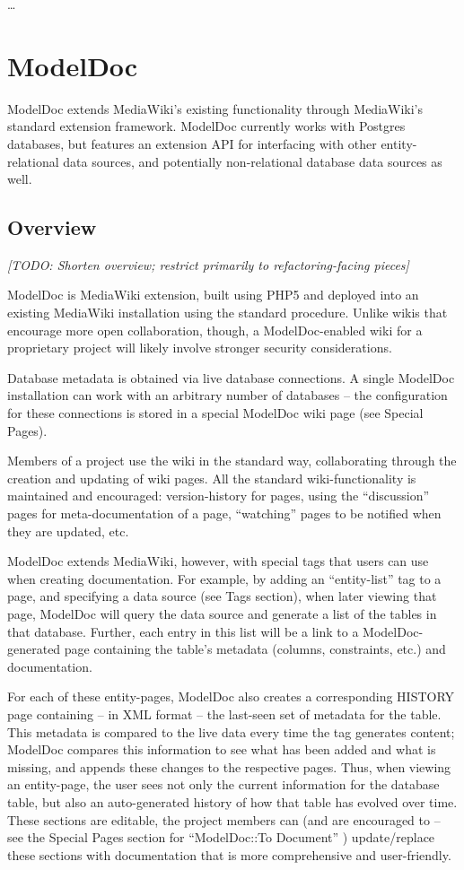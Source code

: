 \documentclass{acm_proc_article-sp}
\begin{document}
\ldots

\section{ModelDoc}

ModelDoc extends MediaWiki's existing functionality through MediaWiki's
standard extension framework.  ModelDoc currently works with Postgres
databases, but features an extension API for interfacing with other
entity-relational data sources, and potentially non-relational database data
sources as well.

\subsection{Overview}

\textit{[TODO: Shorten overview; restrict primarily to refactoring-facing
pieces]}

ModelDoc is MediaWiki extension, built using PHP5 and deployed into an existing
MediaWiki installation using the standard procedure.  Unlike wikis that
encourage more open collaboration, though, a ModelDoc-enabled wiki for a
proprietary project will likely involve stronger security considerations.

Database metadata is obtained via live database connections.  A single ModelDoc
installation can work with an arbitrary number of databases -- the
configuration for these connections is stored in a special ModelDoc wiki page
(see Special Pages).

Members of a project use the wiki in the standard way, collaborating through
the creation and updating of wiki pages.  All the standard wiki-functionality
is maintained and encouraged: version-history for pages, using the
``discussion'' pages for meta-documentation of a page, ``watching'' pages to be
notified when they are updated, etc.

ModelDoc extends MediaWiki, however, with special tags that users can use when
creating documentation.  For example, by adding an ``entity-list'' tag to a
page, and specifying a data source (see Tags section), when later viewing that
page, ModelDoc will query the data source and generate a list of the tables in
that database.  Further, each entry in this list will be a link to a
ModelDoc-generated page containing the table's metadata (columns,
constraints, etc.) and documentation.

For each of these entity-pages, ModelDoc also creates a corresponding HISTORY
page containing -- in XML format -- the last-seen set of metadata for the
table.  This metadata is compared to the live data every time the tag generates
content; ModelDoc compares this information to see what has been added and what
is missing, and appends these changes to the respective pages.  Thus, when
viewing an entity-page, the user sees not only the current information for the
database table, but also an auto-generated history of how that table has
evolved over time.  These sections are editable, the project members can (and
are encouraged to -- see the Special Pages section for ``ModelDoc::To Document''
) update/replace these sections with documentation that is more comprehensive
and user-friendly.
\end{document}
